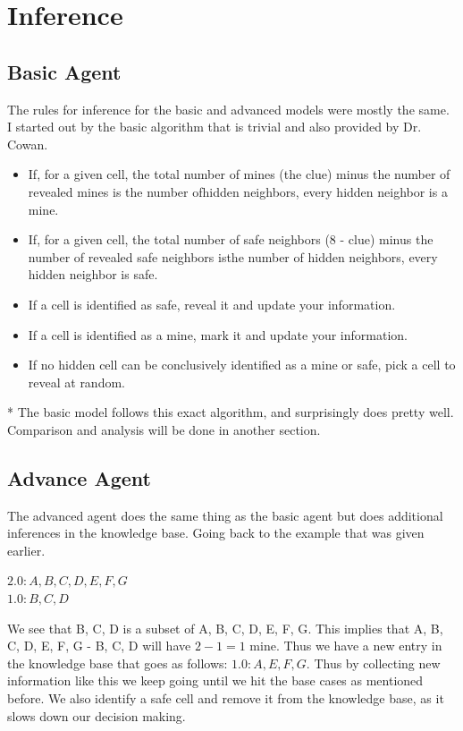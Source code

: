 \documentclass[11pt]{scrartcl} %
\begin{document}
\section{Inference}
\subsection{Basic Agent}
The rules for inference for the basic and advanced models were mostly the same. I started out by the basic algorithm that is trivial and also provided by Dr. Cowan. 
\begin{itemize}[leftmargin = *]
\item If, for a given cell, the total number of mines (the clue) minus the number of revealed mines is the number ofhidden neighbors, every hidden neighbor is a mine.
\item If, for a given cell, the total number of safe neighbors (8 - clue) minus the number of revealed safe neighbors isthe number of hidden neighbors, every hidden neighbor is safe.
\item If a cell is identified as safe, reveal it and update your information.
\item If a cell is identified as a mine, mark it and update your information.
\item If no hidden cell can be conclusively identified as a mine or safe, pick a cell to reveal at random.
\end{itemize} 

* The basic model follows this exact algorithm, and surprisingly does pretty well. Comparison and analysis will be done in another section. 

\subsection{Advance Agent}
The advanced agent does the same thing as the basic agent but does additional inferences in the knowledge base. Going back to the example that was given earlier.
\begin{center}
$2.0:{A, B, C, D, E, F, G}$\\
$1.0:{B, C, D}$ 
\end{center}
We see that {B, C, D} is a subset of {A, B, C, D, E, F, G}. This implies that {A, B, C, D, E, F, G} - {B, C, D} will have $2-1=1$ mine. Thus we have a new entry in the knowledge base that goes as follows: $1.0:{A, E, F, G}$. Thus by collecting new information like this we keep going until we hit the base cases as mentioned before. We also identify a safe cell and remove it from the knowledge base, as it slows down our decision making. 
\end{document}
